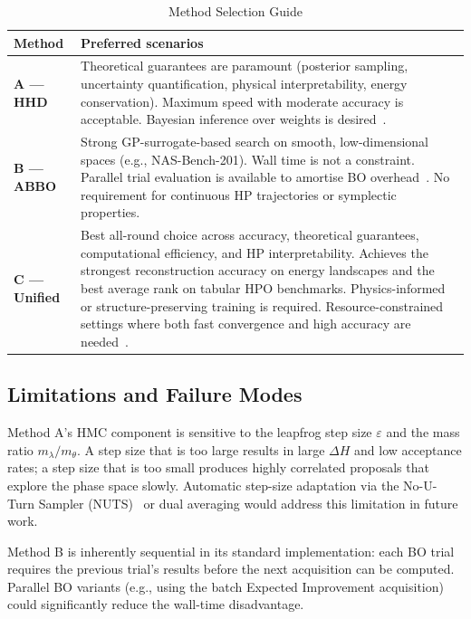 \documentclass[12pt,a4paper]{article}
\begin{document}
\begin{table}[tb]
\centering
\caption{Method Selection Guide}
\label{tab:guide}
\renewcommand{\arraystretch}{1.35}
\begin{tabular}{p{1.8cm}p{5.5cm}}
\toprule
\textbf{Method} & \textbf{Preferred scenarios} \\
\midrule
\textbf{A — HHD} & Theoretical guarantees are paramount (posterior
sampling, uncertainty quantification, physical interpretability,
energy conservation).  Maximum speed with moderate accuracy is
acceptable.  Bayesian inference over weights is desired~\cite{betancourt2017}. \\
\midrule
\textbf{B — ABBO} & Strong GP-surrogate-based search on smooth,
low-dimensional spaces (e.g., NAS-Bench-201).  Wall time is not a
constraint.  Parallel trial evaluation is available to amortise BO
overhead~\cite{snoek2012}.  No requirement for continuous HP
trajectories or symplectic properties. \\
\midrule
\textbf{C — Unified} & Best all-round choice across accuracy,
theoretical guarantees, computational efficiency, and HP
interpretability.  Achieves the strongest reconstruction accuracy
on energy landscapes and the best average rank on tabular HPO
benchmarks.  Physics-informed or structure-preserving training
is required.  Resource-constrained settings where both fast
convergence and high accuracy are needed~\cite{kiyani2025}. \\
\bottomrule
\end{tabular}
\end{table}

\subsection{Limitations and Failure Modes}

Method A's HMC component is sensitive to the leapfrog step size
$\varepsilon$ and the mass ratio $m_\lambda / m_\theta$.  A step size
that is too large results in large $\Delta H$ and low acceptance rates;
a step size that is too small produces highly correlated proposals that
explore the phase space slowly.  Automatic step-size adaptation via the
No-U-Turn Sampler (NUTS)~\cite{betancourt2017} or dual averaging would
address this limitation in future work.

Method B is inherently sequential in its standard implementation:
each BO trial requires the previous trial's results before the next
acquisition can be computed.  Parallel BO variants (e.g., using the
batch Expected Improvement acquisition) could significantly reduce the
wall-time disadvantage.
\end{document}
